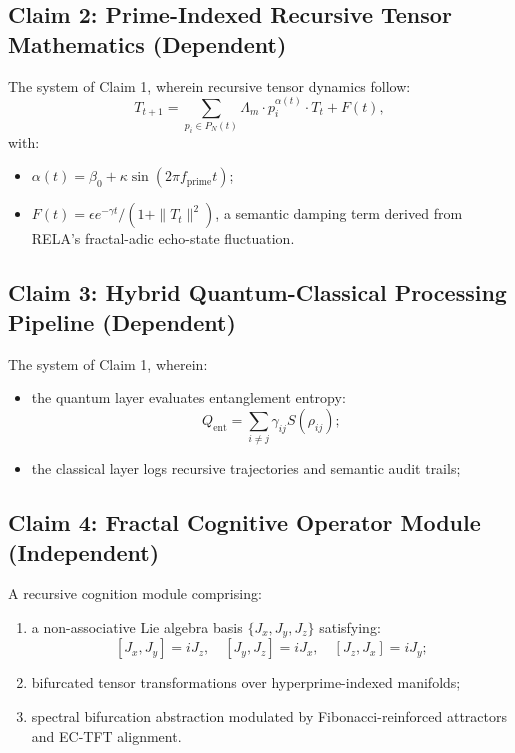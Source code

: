 \documentclass[12pt]{article}
\begin{document}
\subsection*{Claim 2: Prime-Indexed Recursive Tensor Mathematics (Dependent)}

The system of Claim 1, wherein recursive tensor dynamics follow:
\[
T_{t+1} = \sum_{p_i \in P_N(t)} \Lambda_m \cdot p_i^{\alpha(t)} \cdot T_t + F(t),
\]
with:
\begin{itemize}
    \item \( \alpha(t) = \beta_0 + \kappa \sin(2\pi f_{\text{prime}} t) \);
    \item \( F(t) = \epsilon e^{-\gamma t} / (1 + \|T_t\|^2) \), a semantic damping term derived from RELA’s fractal-adic echo-state fluctuation.
\end{itemize}

\subsection*{Claim 3: Hybrid Quantum-Classical Processing Pipeline (Dependent)}

The system of Claim 1, wherein:

\begin{itemize}
    \item the quantum layer evaluates entanglement entropy:
    \[
    Q_{\text{ent}} = \sum_{i \neq j} \gamma_{ij} S(\rho_{ij});
    \]

    \item the classical layer logs recursive trajectories and semantic audit trails;

\end{itemize}

\subsection*{Claim 4: Fractal Cognitive Operator Module (Independent)}

A recursive cognition module comprising:

\begin{enumerate}
    \item a non-associative Lie algebra basis \( \{J_x, J_y, J_z\} \) satisfying:
    \[
    [J_x, J_y] = iJ_z, \quad [J_y, J_z] = iJ_x, \quad [J_z, J_x] = iJ_y;
    \]

    \item bifurcated tensor transformations over hyperprime-indexed manifolds;

    \item spectral bifurcation abstraction modulated by Fibonacci-reinforced attractors and EC-TFT alignment.
\end{enumerate}
\end{document}
